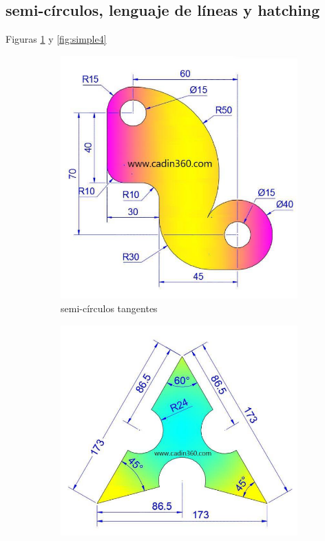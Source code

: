 \documentclass[letterpaper,pdftex]{article}
\begin{document}
\subsection{semi-círculos, lenguaje de líneas y hatching}

Figuras \ref{fig:simple3} y \ref{fig:simple4}

\begin{figure}[h]
     \centering
     \begin{subfigure}[b]{0.45\textwidth}
         \centering
         \includegraphics[width=\textwidth]{graph3}
         \caption{semi-círculos tangentes}
         \label{fig:simple3}
     \end{subfigure}
     \hfill
     \begin{subfigure}[b]{0.45\textwidth}
         \centering
         \includegraphics[width=\textwidth]{graph4}

\end{subfigure}
\end{figure}
\end{document}
